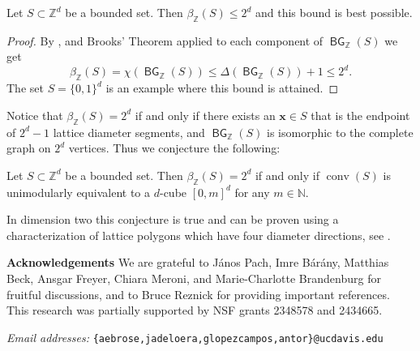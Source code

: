 \documentclass[11pt]{article}
\newcommand{\bx}{\mathbf{x}}
\newcommand{\Z}{\mathbb{Z}}
\newcommand{\N}{\mathbb{N}}
\DeclareMathOperator{\conv}{conv}
\DeclareMathOperator{\BG}{\mathsf{BG}} %
\begin{document}
\begin{theorem}\label{Thm:Borsuk}
     Let $S \subset \Z^d$ be a bounded set. Then $\beta_\Z(S) \leq 2^d$ and this bound is best possible.
\end{theorem}

\begin{proof}
    By ,  and Brooks' Theorem applied to each component of $\BG_\Z(S)$ we get
    \[
    \beta_\Z(S) = \chi(\BG_\Z(S)) \leq \Delta (\BG_\Z(S)) +1 \leq 2^d.
    \]
    The set $S=\{0,1\}^d$ is an example where this bound is attained.
\end{proof}

Notice that $\beta_\Z(S)= 2^d$ if and only if there exists an $\bx \in S$ that is the endpoint of $2^d-1$ lattice diameter segments, and $\BG_\Z(S)$ is isomorphic to the complete graph on $2^d$ vertices. Thus we conjecture the following:
\begin{conjecture}\label{conj:Borsuk}
    Let $S \subset \Z^d$ be a bounded set. Then $\beta_\Z(S) =2^d$ if and only if $\conv(S)$ is unimodularly equivalent to a $d$-cube $[0,m]^d$ for any $m \in \N$.
\end{conjecture}

In dimension two this conjecture is true and can be proven using a characterization of lattice polygons which have four diameter directions, see \cite[Theorem~2(iii)]{Barany_Furedi}.

\textbf{Acknowledgements}
We are grateful to János Pach, Imre Bárány, Matthias Beck, Ansgar Freyer, Chiara Meroni, and Marie-Charlotte Brandenburg for fruitful discussions, and to Bruce Reznick for providing important references.
This research was partially supported by NSF grants 2348578 and 2434665.



{ \linespread{1.0} \small }

\vspace{2ex}

\emph{Email addresses:} \texttt{\{aebrose,jadeloera,glopezcampos,antor\}@ucdavis.edu} 
\end{document}
